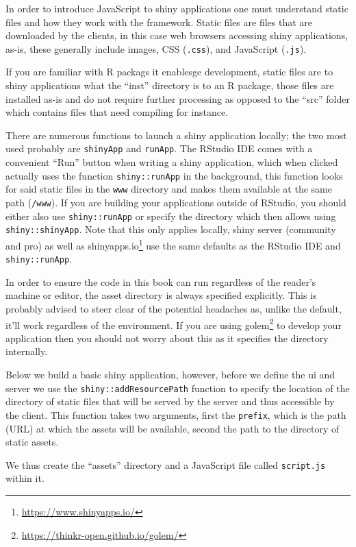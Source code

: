 \documentclass[
]{krantz}
\renewcommand{\href}[2]{#2\footnote{\url{#1}}}
\begin{document}
In order to introduce JavaScript to shiny applications one must understand static files and how they work with the framework. Static files are files that are downloaded by the clients, in this case web browsers accessing shiny applications, as-is, these generally include images, CSS (\texttt{.css}), and JavaScript (\texttt{.js}).

If you are familiar with R packags it enablesge development, static files are to shiny applications what the ``inst'' directory is to an R package, those files are installed as-is and do not require further processing as opposed to the ``src'' folder which contains files that need compiling for instance.

There are numerous functions to launch a shiny application locally; the two most used probably are \texttt{shinyApp} and \texttt{runApp}. The RStudio IDE comes with a convenient ``Run'' button when writing a shiny application, which when clicked actually uses the function \texttt{shiny::runApp} in the background, this function looks for said static files in the \texttt{www} directory and makes them available at the same path (\texttt{/www}). If you are building your applications outside of RStudio, you should either also use \texttt{shiny::runApp} or specify the directory which then allows using \texttt{shiny::shinyApp}. Note that this only applies locally, shiny server (community and pro) as well as \href{https://www.shinyapps.io/}{shinyapps.io} use the same defaults as the RStudio IDE and \texttt{shiny::runApp}.

In order to ensure the code in this book can run regardless of the reader's machine or editor, the asset directory is always specified explicitly. This is probably advised to steer clear of the potential headaches as, unlike the default, it'll work regardless of the environment. If you are using \href{https://thinkr-open.github.io/golem/}{golem} \citep{R-golem} to develop your application then you should not worry about this as it specifies the directory internally.

Below we build a basic shiny application, however, before we define the ui and server we use the \texttt{shiny::addResourcePath} function to specify the location of the directory of static files that will be served by the server and thus accessible by the client. This function takes two arguments, first the \texttt{prefix}, which is the path (URL) at which the assets will be available, second the path to the directory of static assets.

We thus create the ``assets'' directory and a JavaScript file called \texttt{script.js} within it.
\end{document}
